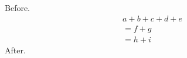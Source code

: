 \documentclass[10pt,leqno]{article}
\begin{document}
Before.
\begin{multline} a + b + c + d + e \\ = f + g \\ = h + i \tag{$\ast$} \end{multline}
After.
\end{document}
